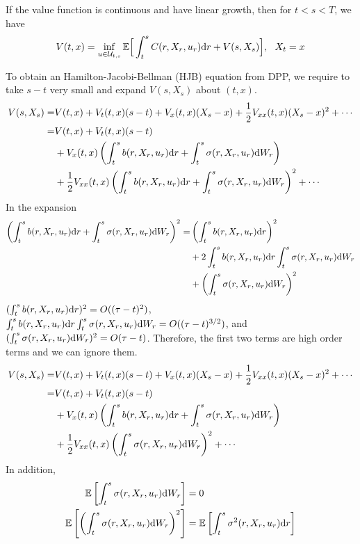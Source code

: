\documentclass[11pt]{book}
\newcommand{\dr}{\text{\normalfont d}r}
\newcommand{\dW}{\text{\normalfont d}W}
\begin{document}
\begin{thm}\label{thm:stoch_dpp_no_stopping}
    If the value function is continuous and have linear growth, then for $t<s<T$, we have 
    \begin{equation}\label{eqn:stoch_dpp_no_stopping}
        V(t,x)= \inf_{u\in\mathcal{U}_{t,s}}\mathbb{E}\Big[\int_t^s C(r,X_r,u_r){\dr} + V(s,X_s)\Big],~~X_t=x
    \end{equation}
\end{thm}
To obtain an Hamilton-Jacobi-Bellman (HJB) equation from DPP, we require to take $s-t$ very small and expand $V(s,X_s)$ about $(t,x)$.
\[
\begin{split}
    V(s,X_s)  = & V(t,x) + V_t(t,x)(s-t) +V_x(t,x)(X_s-x) + \frac12 V_{xx}(t,x)(X_s-x)^2 + \cdots\\
     =&V(t,x) + V_t(t,x)(s-t) \\
     &+V_x(t,x)\left(\int_t^s b(r,X_r,u_r)\dr +\int_t^s \sigma(r,X_r,u_r)\dW_r\right) \\
     &+ \frac12 V_{xx}(t,x)\left(\int_t^s b(r,X_r,u_r)\dr +\int_t^s\sigma(r,X_r,u_r)\dW_r\right)^2 + \cdots
\end{split}
\]
In the expansion
\[
\begin{split}
    \left(\int_t^s  b(r,X_r,u_r)\dr +\int_t^s  \sigma(r,X_r,u_r)\dW_r\right)^2 = &\left(\int_t^s  b(r,X_r,u_r)\dr\right)^2 \\
    &+2\int_t^s  b(r,X_r,u_r)\dr\int_t^s  \sigma(r,X_r,u_r)\dW_r\\
    &+\left(\int_t^s  \sigma(r,X_r,u_r)\dW_r\right)^2
\end{split}
\]
$(\int_t^s  b(r,X_r,u_r)\dr)^2=O((\tau-t)^2)$, $\int_t^s  b(r,X_r,u_r)\dr\int_t^s  \sigma(r,X_r,u_r)\dW_r=O((\tau-t)^{3/2})$, and $(\int_t^s  \sigma(r,X_r,u_r)\dW_r)^2=O(\tau-t)$. Therefore, the first two terms are high order terms and we can ignore them. 
\[
\begin{split}
    V(s,X_s)  = & V(t,x) + V_t(t,x)(s-t) +V_x(t,x)(X_s-x) + \frac12 V_{xx}(t,x)(X_s-x)^2 + \cdots\\
     =&V(t,x) + V_t(t,x)(s-t) \\
     &+V_x(t,x)\left(\int_t^s  b(r,X_r,u_r)\dr +\int_t^s  \sigma(r,X_r,u_r)\dW_r\right) \\
     &+ \frac12 V_{xx}(t,x)\left(\int_t^s  \sigma(r,X_r,u_r)\dW_r\right)^2 + \cdots
\end{split}
\]
In addition, 
\begin{align}
    \mathbb{E}\left[\int_t^s  \sigma(r,X_r,u_r)\dW_r\right]&=0\label{dpp:mean_zero}\\
    \mathbb{E}\left[\left(\int_t^s  \sigma(r,X_r,u_r)\dW_r\right)^2\right]&=\mathbb{E}\left[\int_t^s  \sigma^2(r,X_r,u_r)\dr\right]\label{dpp:variance}
\end{align}
\end{document}
